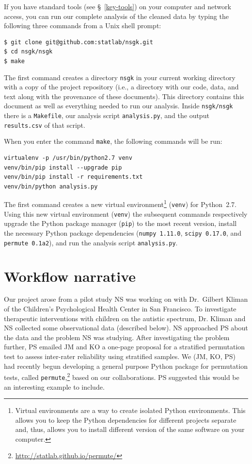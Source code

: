 \documentclass[]{article}
\begin{document}
If you have standard tools (see \S~\ref{key-tools}) on your
computer and network access, you can run our complete analysis of the cleaned
data by typing the following three commands from a Unix shell prompt:
\begin{verbatim}
$ git clone git@github.com:statlab/nsgk.git
$ cd nsgk/nsgk
$ make
\end{verbatim}
The first command creates a directory \texttt{nsgk} in your current working
directory with a copy of the project repository (i.e., a directory with our
code, data, and text along with the provenance of these documents).
This directory contains this document as well as everything needed to run our
analysis.
Inside \texttt{nsgk/nsgk} there is a \texttt{Makefile}, our analysis script
\texttt{analysis.py}, and the output \texttt{results.csv} of that script.

When you enter the command \texttt{make}, the following commands will be run:
\begin{verbatim}
virtualenv -p /usr/bin/python2.7 venv
venv/bin/pip install --upgrade pip
venv/bin/pip install -r requirements.txt
venv/bin/python analysis.py
\end{verbatim}
The first command creates a new virtual environment\footnote{
Virtual environments are a way to create isolated Python environments.
This allows you to keep the Python dependencies for different
projects separate and, thus, allows you to install different
version of the same software on your computer.
}
(\texttt{venv}) for Python~2.7.
Using this new virtual environment (\texttt{venv}) the subsequent commands
respectively upgrade the Python package manager (\texttt{pip}) to the most
recent version, install the necessary Python package dependencies
(\texttt{numpy~1.11.0}, \texttt{scipy~0.17.0}, and \texttt{permute~0.1a2}),
and run the analysis script \texttt{analysis.py}.

\section{Workflow narrative}

Our project arose from a pilot study NS was working on with Dr.~Gilbert Kliman of
the Children's Psychological Health Center in San Francisco.
To investigate therapeutic interventions with children on the autistic spectrum,
Dr. Kliman and NS collected some observational data (described below).
NS approached PS about the data and the problem NS was studying.
After investigating the problem further, PS emailed JM and KO a one-page
proposal for a stratified permutation test to assess inter-rater
reliability using stratified samples.
We (JM, KO, PS) had recently begun developing a general purpose Python package
for permutation tests, called
\texttt{permute},\footnote{
\url{http://statlab.github.io/permute/}
}
based on our collaborations.
PS suggested this would be an interesting example to include.
\end{document}
